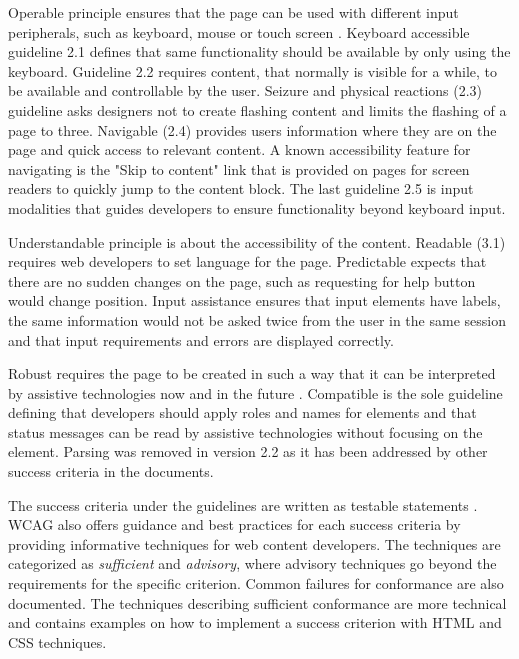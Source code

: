 Operable principle ensures that the page can be used with different input peripherals, such as keyboard, mouse or touch screen \cite{wcag22}. Keyboard accessible guideline 2.1 defines that same functionality should be available by only using the keyboard. Guideline 2.2 requires content, that normally is visible for a while, to be available and controllable by the user. Seizure and physical reactions (2.3) guideline asks designers not to create flashing content and limits the flashing of a page to three. Navigable (2.4) provides users information where they are on the page and quick access to relevant content. A known accessibility feature for navigating is the "Skip to content" link that is provided on pages for screen readers to quickly jump to the content block. The last guideline 2.5 is input modalities that guides developers to ensure functionality beyond keyboard input.

Understandable principle is about the accessibility of the content. Readable (3.1) requires web developers to set language for the page. Predictable expects that there are no sudden changes on the page, such as requesting for help button would change position. Input assistance ensures that input elements have labels, the same information would not be asked twice from the user in the same session and that input requirements and errors are displayed correctly. 

Robust requires the page to be created in such a way that it can be interpreted by assistive technologies now and in the future \citep{wcag22}. Compatible is the sole guideline defining that developers should apply roles and names for elements and that status messages can be read by assistive technologies without focusing on the element. Parsing was removed in version 2.2 as it has been addressed by other success criteria in the documents.

The success criteria under the guidelines are written as testable statements \citep{wcag22}. WCAG also offers guidance and best practices for each success criteria by providing informative techniques for web content developers. The techniques are categorized as \textit{sufficient} and \textit{advisory}, where advisory techniques go beyond the requirements for the specific criterion. Common failures for conformance are also documented. The techniques describing sufficient conformance are more technical and contains examples on how to implement a success criterion with HTML and CSS techniques.





